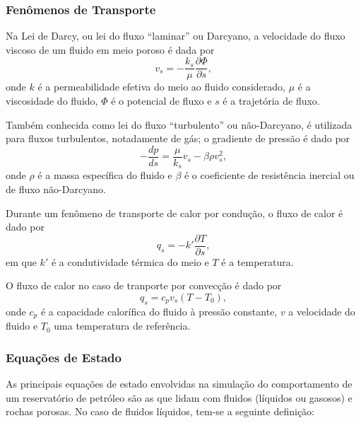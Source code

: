 \subsubsection{Fen\^{o}menos de Transporte}

\begin{theorem}
Na Lei de Darcy, ou lei do fluxo ``laminar'' ou Darcyano, a velocidade do fluxo viscoso de um fluido em meio poroso \'{e} dada por
\begin{equation}
	v_s = -\frac{k_s}{\mu} \frac{\partial\Phi}{\partial s},
\end{equation}
onde $k$ \'{e} a permeabilidade efetiva do meio ao fluido considerado, $\mu$ \'{e} a viscosidade do fluido, $\Phi$ \'{e} o potencial de fluxo e $s$ \'{e} a trajet\'{o}ria de fluxo.
\end{theorem}

\begin{theorem}
Tamb\'{e}m conhecida como lei do fluxo ``turbulento'' ou n\~{a}o-Darcyano, \'{e} utilizada para fluxos turbulentos, notadamente de g\'{a}s; o gradiente de press\~{a}o \'{e} dado por
\begin{equation}
	-\frac{dp}{ds} = \frac{\mu}{k_s}v_s - \beta\rho v_s^2,
\end{equation}
onde $\rho$ \'{e} a massa espec\'{i}fica do fluido e $\beta$ \'{e} o coeficiente de resist\^{e}ncia inercial ou de fluxo n\~{a}o-Darcyano. 
\end{theorem}

\begin{theorem}
Durante um fen\^{o}meno de transporte de calor por condu\c{c}\~{a}o, o fluxo de calor \'{e} dado por
\begin{equation}
	q_s = -k'\frac{\partial T}{\partial s},
\end{equation}
em que $k'$ \'{e} a condutividade t\'{e}rmica do meio e $T$ \'{e} a temperatura.
\end{theorem}

\begin{theorem}[Convec\c{c}\~{a}o]
O fluxo de calor no caso de tranporte por convec\c{c}\~{a}o \'{e} dado por
\begin{equation}
	q_s = c_p v_s (T - T_0),
\end{equation}
onde $c_p$ \'{e} a capacidade calor\'{i}fica do fluido \`{a} press\~{a}o constante, $v$ a velocidade do fluido e $T_0$ uma temperatura de refer\^{e}ncia.
\end{theorem}

\subsubsection{Equa\c{c}\~{o}es de Estado}
As principais equa\c{c}\~{o}es de estado envolvidas na simula\c{c}\~{a}o do comportamento de um reservat\'{o}rio de petr\'{o}leo s\~{a}o as que lidam com fluidos (l\'{i}quidos ou gasosos) e rochas porosas. No caso de fluidos l\'{i}quidos, tem-se a seguinte defini\c{c}\~{a}o:

